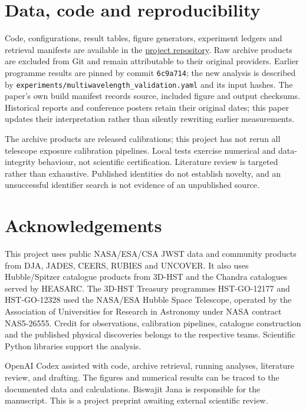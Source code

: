 \documentclass[11pt,a4paper]{article}
\begin{document}
\section*{Data, code and reproducibility}
Code, configurations, result tables, figure generators, experiment ledgers and retrieval manifests are available in the \href{https://github.com/Biswajit1999/JWST-Cosmic-Anomaly-Lab}{project repository}. Raw archive products are excluded from Git and remain attributable to their original providers. Earlier programme results are pinned by commit \texttt{6c9a714}; the new analysis is described by \texttt{experiments/multiwavelength\_validation.yaml} and its input hashes. The paper's own build manifest records source, included figure and output checksums. Historical reports and conference posters retain their original dates; this paper updates their interpretation rather than silently rewriting earlier measurements.

The archive products are released calibrations; this project has not rerun all telescope exposure calibration pipelines. Local tests exercise numerical and data-integrity behaviour, not scientific certification. Literature review is targeted rather than exhaustive. Published identities do not establish novelty, and an unsuccessful identifier search is not evidence of an unpublished source.

\section*{Acknowledgements}
This project uses public NASA/ESA/CSA JWST data and community products from DJA, JADES, CEERS, RUBIES and UNCOVER. It also uses Hubble/Spitzer catalogue products from 3D-HST and the Chandra catalogues served by HEASARC. The 3D-HST Treasury programmes HST-GO-12177 and HST-GO-12328 used the NASA/ESA Hubble Space Telescope, operated by the Association of Universities for Research in Astronomy under NASA contract NAS5-26555. Credit for observations, calibration pipelines, catalogue construction and the published physical discoveries belongs to the respective teams. Scientific Python libraries support the analysis.

OpenAI Codex assisted with code, archive retrieval, running analyses, literature review, and drafting. The figures and numerical results can be traced to the documented data and calculations. Biswajit Jana is responsible for the manuscript. This is a project preprint awaiting external scientific review.
\end{document}
